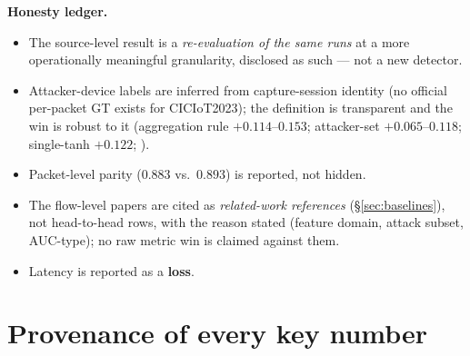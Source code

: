 \documentclass[11pt]{article}
\begin{document}
\noindent\textbf{Honesty ledger.}
\begin{itemize}
  \item The source-level result is a \emph{re-evaluation of the same runs} at a more operationally
        meaningful granularity, disclosed as such --- not a new detector.
  \item Attacker-device labels are inferred from capture-session identity (no official per-packet GT
        exists for CICIoT2023); the definition is transparent and the win is robust to it
        (aggregation rule $+0.114$--$0.153$; attacker-set $+0.065$--$0.118$; single-tanh $+0.122$;
        ).
  \item Packet-level parity ($0.883$ vs.\ $0.893$) is reported, not hidden.
  \item The flow-level papers are cited as \emph{related-work references} (\S\ref{sec:baselines}), not
        head-to-head rows, with the reason stated (feature domain, attack subset, AUC-type); no raw
        metric win is claimed against them.
  \item Latency is reported as a \textbf{loss}.
\end{itemize}

\appendix
\section{Provenance of every key number}
\label{sec:prov}
\end{document}
